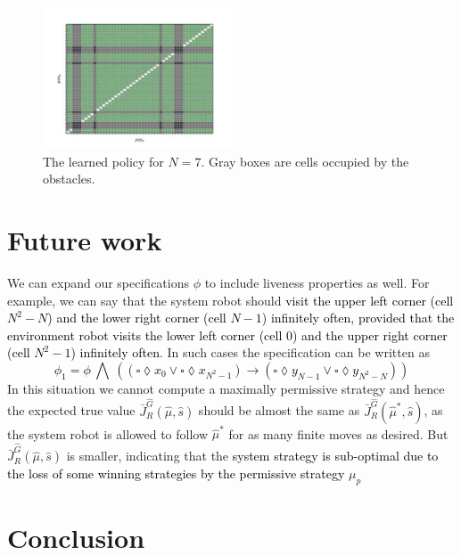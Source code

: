 \documentclass[letterpaper, 10 pt, conference]{ieeeconf}  %
\begin{document}
\begin{figure}[t]
    \centering
    \includegraphics[width=0.5\textwidth]{images/Policy for G_hat_N_7_N_7.png}
\caption{The learned policy for $N = 7$. Gray boxes are cells occupied by the obstacles.}
\label{fig:policy N 7}
\end{figure}


\section{Future work}

We can expand our specifications $\phi$ to include liveness properties as well.  For example, we can say that the system robot should \textcolor{black} {visit the upper left corner (cell $N^2 - N$) and the lower right corner (cell $N-1$) infinitely often, provided that the environment robot visits the lower left corner (cell $0$) and the upper right corner (cell $N^2 -1$) infinitely often}. In such cases the specification can be written as
\textcolor{black}{
\begin{equation}
    \phi_1 = \phi\: \bigwedge\: ((\square\lozenge x_0 \vee \square\lozenge x_{N^2 - 1}) \rightarrow (\square\lozenge y_{N - 1} \vee \square\lozenge y_{N^2 - N}))
\end{equation}
}
In this situation we cannot compute a maximally permissive strategy and hence the expected true value $\bar{J}_R^{\hat{G}}(\hat{\mu}, \hat{s})$ should be almost the same as $\bar{J}_R^{\hat{G}}(\hat{\mu}^*, \hat{s})$, as the system robot is allowed to follow $\hat{\mu}^*$ for as many finite moves as desired. But $\bar{J}_R^{\hat{G}}(\hat{\mu}, \hat{s})$ is smaller, indicating that the \textcolor{black} {system strategy is sub-optimal due to the loss of some winning strategies by the permissive strategy} $\mu_p$

\section{Conclusion}
\end{document}
